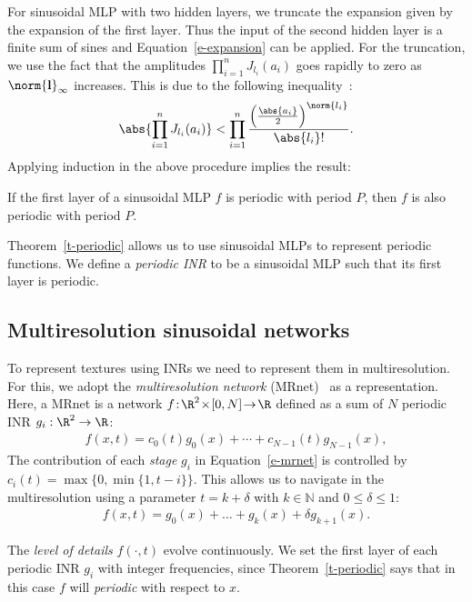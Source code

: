 For sinusoidal MLP with two hidden layers, we truncate the expansion given by the expansion of the first layer. Thus the input of the second hidden layer is a finite sum of sines and Equation~\ref{e-expansion} can be applied.
For the truncation, we use the fact that the amplitudes
$\prod_{i=1}^n J_{l_i}(a_i)$ goes rapidly to zero as $\norm{\textbf{l}}_{\infty}$ increases. This is due to the following inequality~\cite{novello2022understanding}:
\begin{align}\label{e-upper-bound-freq}
    \abs{\prod_{i=1}^n J_{l_i}(a_i)}<
    \prod_{i=1}^n\frac{\left(\frac{\abs{a_i}}{2}\right)^{\norm{l_i}}}{\abs{l_i}!}.
\end{align}
Applying induction in the above procedure implies the result:
\begin{theorem}
\label{t-periodic}
    If the first layer of a sinusoidal MLP $f$ is periodic with period $P$, then $f$ is also periodic with period $P$.
\end{theorem}

Theorem~\ref{t-periodic} allows us to use sinusoidal MLPs to represent periodic functions. 
We define a \textit{periodic INR} to be a sinusoidal MLP such that its first layer is periodic. 

\subsection{Multiresolution sinusoidal networks}\label{s-mr-networks}
\label{s-multiresolution}
To represent textures using INRs we need to represent them in multiresolution. For this, we adopt the \textit{multiresolution network} (MRnet)~\cite{paz2022} as a representation. Here, a MRnet is a network $f\!:\!\R^2\!\times\! [0,N]\!\to\! \R$ defined as a sum of $N$ periodic INR $g_i:\R^2\to\R$:
\begin{align}\label{e-mrnet}
f(x,t) = c_0(t)g_0(x) + \cdots + c_{N-1}(t)g_{N-1}(x),
\end{align}
The contribution of each \textit{stage} $g_i$ in Equation~\ref{e-mrnet} is controlled by $
c_i(t)\!=\!\max\big\{0, \min\big\{1, t-i\big\}\big\}.$
This allows us to navigate in the multiresolution using a parameter $t\!=\!k+\delta$ with $k\in\mathbb{N}$ and $0\leq\delta\leq 1$:
\begin{align}\label{e-mrnet2}
f(x,t)=g_0(x)+\dots + g_k(x)+\delta g_{k+1}(x).
\end{align}

The \textit{level of details} $f(\cdot, t)$ evolve continuously.
We set the first layer of each periodic INR $g_i$ with integer frequencies, since Theorem~\ref{t-periodic} says that in this case $f$ will \textit{periodic} with respect to $x$.

